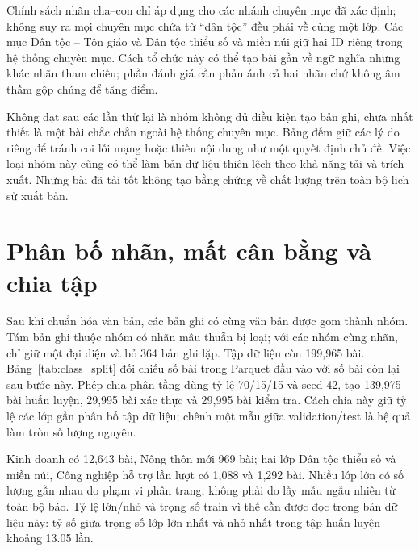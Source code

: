 Chính sách nhãn cha--con chỉ áp dụng cho các nhánh chuyên mục đã xác định; không suy ra mọi chuyên mục chứa từ ``dân tộc'' đều phải về cùng một lớp. Các mục Dân tộc -- Tôn giáo và Dân tộc thiểu số và miền núi giữ hai ID riêng trong hệ thống chuyên mục. Cách tổ chức này có thể tạo bài gần về ngữ nghĩa nhưng khác nhãn tham chiếu; phần đánh giá cần phản ánh cả hai nhãn chứ không âm thầm gộp chúng để tăng điểm.

Không đạt sau các lần thử lại là nhóm không đủ điều kiện tạo bản ghi, chưa nhất thiết là một bài chắc chắn ngoài hệ thống chuyên mục. Bảng đếm giữ các lý do riêng để tránh coi lỗi mạng hoặc thiếu nội dung như một quyết định chủ đề. Việc loại nhóm này cũng có thể làm bản dữ liệu thiên lệch theo khả năng tải và trích xuất. Những bài đã tải tốt không tạo bằng chứng về chất lượng trên toàn bộ lịch sử xuất bản.

\FloatBarrier
\section{Phân bố nhãn, mất cân bằng và chia tập}
Sau khi chuẩn hóa văn bản, các bản ghi có cùng văn bản được gom thành nhóm. Tám bản ghi thuộc nhóm có nhãn mâu thuẫn bị loại; với các nhóm cùng nhãn, chỉ giữ một đại diện và bỏ 364 bản ghi lặp. Tập dữ liệu còn 199,965 bài. Bảng~\ref{tab:class_split} đối chiếu số bài trong Parquet đầu vào với số bài còn lại sau bước này. Phép chia phân tầng dùng tỷ lệ 70/15/15 và seed 42, tạo 139,975 bài huấn luyện, 29,995 bài xác thực và 29,995 bài kiểm tra. Cách chia này giữ tỷ lệ các lớp gần phân bố tập dữ liệu; chênh một mẫu giữa validation/test là hệ quả làm tròn số lượng nguyên.
\begin{table}[htbp]\centering\small\setlength{\tabcolsep}{3pt}
\caption{Hệ thống chuyên mục và số bài ở từng giai đoạn; ID thống nhất trong notebook và app.}\label{tab:class_split}
\end{table}
\SplitDiagram
{}
Kinh doanh có 12,643 bài, Nông thôn mới 969 bài; hai lớp Dân tộc thiểu số và miền núi, Công nghiệp hỗ trợ lần lượt có 1,088 và 1,292 bài. Nhiều lớp lớn có số lượng gần nhau do phạm vi phân trang, không phải do lấy mẫu ngẫu nhiên từ toàn bộ báo. Tỷ lệ lớn/nhỏ và trọng số train vì thế cần được đọc trong bản dữ liệu này: tỷ số giữa trọng số lớp lớn nhất và nhỏ nhất trong tập huấn luyện khoảng 13.05 lần.

